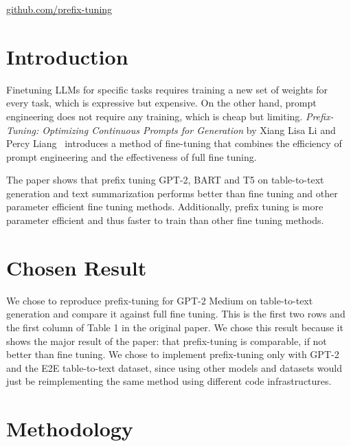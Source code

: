 \documentclass[11pt]{article} %
\author{Mac Turner, Michael Ngo, Eric Hu, Neeraj Parihar}
\begin{document}
\maketitle
\vspace{-2em}
\hfil\href{https://github.com/Mikonooooo/prefix-tuning}{github.com/prefix-tuning}

\section{Introduction}
Finetuning LLMs for specific tasks requires training a new set of weights for every task, which is expressive but expensive. On the other hand, prompt engineering does not require any training, which is cheap but limiting. \textit{Prefix-Tuning: Optimizing Continuous Prompts for Generation} by Xiang Lisa Li and Percy Liang~\cite{li-liang-2021-prefix} introduces a method of fine-tuning that combines the efficiency of prompt engineering and the effectiveness of full fine tuning.

The paper shows that prefix tuning GPT-2, BART and T5 on table-to-text generation and text summarization performs better than fine tuning and other parameter efficient fine tuning methods. Additionally, prefix tuning is more parameter efficient and thus faster to train than other fine tuning methods.

\section{Chosen Result}

We chose to reproduce prefix-tuning for GPT-2 Medium on table-to-text generation and compare it against full fine tuning. This is the first two rows and the first column of Table 1 in the original paper. We chose this result because it shows the major result of the paper: that prefix-tuning is comparable, if not better than fine tuning. We chose to implement prefix-tuning only with GPT-2 and the E2E table-to-text dataset, since using other models and datasets would just be reimplementing the same method using different code infrastructures. 



\section{Methodology}
\end{document}
